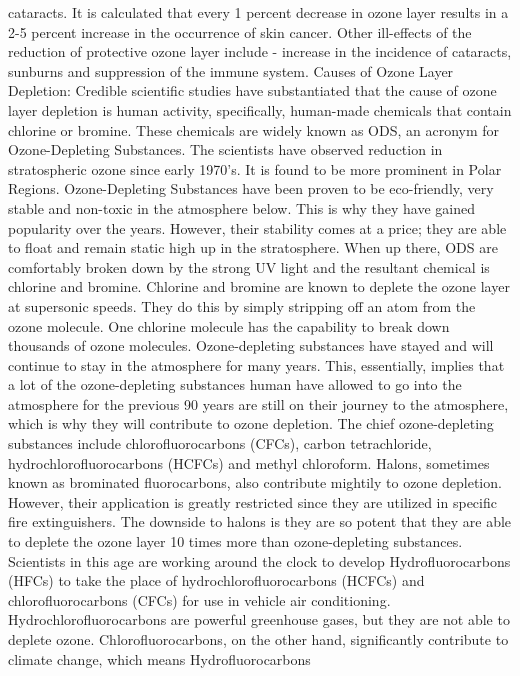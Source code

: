 cataracts. It is calculated that every 1 percent decrease in ozone
layer results in a 2-5 percent increase in the occurrence of skin
cancer. Other ill-effects of the reduction of protective ozone layer
include - increase in the incidence of cataracts, sunburns and
suppression of the immune system.
Causes of Ozone Layer Depletion:
Credible scientific studies have substantiated that the cause of
ozone layer depletion is human activity, specifically, human-made
chemicals that contain chlorine or bromine. These chemicals are
widely known as ODS, an acronym for Ozone-Depleting
Substances. The scientists have observed reduction in stratospheric
ozone since early 1970’s. It is found to be more prominent in Polar
Regions.
Ozone-Depleting Substances have been proven to be eco-friendly,
very stable and non-toxic in the atmosphere below. This is why they
have gained popularity over the years. However, their stability
comes at a price; they are able to float and remain static high up in
the stratosphere. When up there, ODS are comfortably broken
down by the strong UV light and the resultant chemical is chlorine
and bromine. Chlorine and bromine are known to deplete the ozone
layer at supersonic speeds. They do this by simply stripping off an
atom from the ozone molecule. One chlorine molecule has the
capability to break down thousands of ozone molecules.
Ozone-depleting substances have stayed and will continue to stay in
the atmosphere for many years. This, essentially, implies that a lot
of the ozone-depleting substances human have allowed to go into the
atmosphere for the previous 90 years are still on their journey to
the atmosphere, which is why they will contribute to ozone
depletion.
The chief ozone-depleting substances include chlorofluorocarbons
(CFCs), carbon tetrachloride, hydrochlorofluorocarbons (HCFCs) and
methyl chloroform. Halons, sometimes known as brominated
fluorocarbons, also contribute mightily to ozone depletion. However,
their application is greatly restricted since they are utilized in
specific fire extinguishers. The downside to halons is they are so
potent that they are able to deplete the ozone layer 10 times more
than ozone-depleting substances.
Scientists in this age are working around the clock to develop
Hydrofluorocarbons (HFCs) to take the place of
hydrochlorofluorocarbons (HCFCs) and chlorofluorocarbons (CFCs)
for use in vehicle air conditioning. Hydrochlorofluorocarbons
are powerful greenhouse gases, but they are not able to deplete
ozone. Chlorofluorocarbons, on the other hand, significantly
contribute to climate change, which means Hydrofluorocarbons
